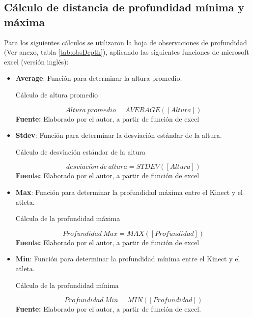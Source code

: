 \subsection{C\'alculo de distancia de profundidad m\'inima y m\'axima} \label{dis:deep}
Para los siguientes c\'alculos se utilizaron la hoja de observaciones de profundidad (Ver anexo, tabla  \ref{tab:obsDepth}), aplicando las siguientes funciones de microsoft excel (versi\'on ingl\'es):
\begin{itemize}
       \item \textbf{Average}: Funci\'on para determinar la altura promedio.
\begin{formula}[H]
	\centering
	\caption{C\'alculo de altura promedio}
	\label{frm:avgHeight}
	\begin{equation}
	Altura \: promedio =AVERAGE([Altura])
	\end{equation}
		\textbf{Fuente:} Elaborado por el autor, a partir de funci\'on de excel
\end{formula}
       \item \textbf{Stdev}: Funci\'on para determinar la desviaci\'on est\'andar de la altura.
\begin{formula}[H]
	\centering
	\caption{C\'alculo de desviaci\'on est\'andar de la altura}
	\label{frm:stdevHeight}
	\begin{equation}
	desviaci\acute{o}n \:  de \: altura =STDEV([Altura])
	\end{equation}
		\textbf{Fuente:} Elaborado por el autor, a partir de funci\'on de excel
\end{formula}
       \item \textbf{Max}: Funci\'on para determinar la profundidad m\'axima entre el Kinect y el atleta.
       \begin{formula}[H]
	\centering
	\caption{C\'alculo de la profundidad m\'axima}
	\label{frm:maxDepth}
	\begin{equation}
	Profundidad \: Max =MAX([Profundidad])
	\end{equation}
		\textbf{Fuente:} Elaborado por el autor, a partir de funci\'on de excel
\end{formula}
       \item \textbf{Min}: Funci\'on para determinar la profundidad m\'inima entre el Kinect y el atleta.
              \begin{formula}[H]
	\centering
	\caption{C\'alculo de la profundidad m\'inima}
	\label{frm:minDepth}
	\begin{equation}
	Profundidad \:  Min =MIN([Profundidad])
	\end{equation}
		\textbf{Fuente:} Elaborado por el autor, a partir de funci\'on de excel.
\end{formula}
\end{itemize}
